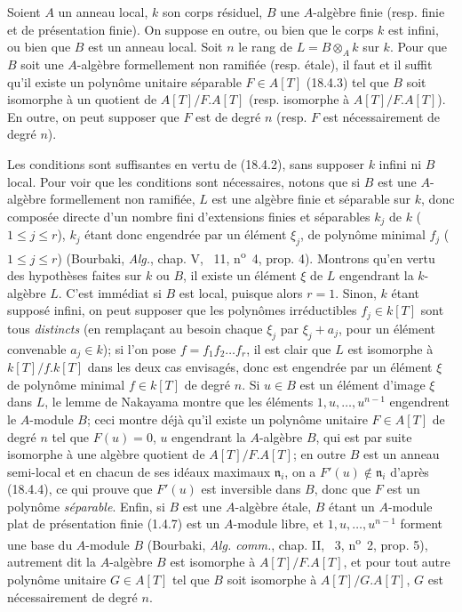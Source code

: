 \begin{proposition}[18.4.5]
\label{IV.18.4.5}
Soient $A$ un anneau local, $k$ son corps résiduel, $B$ une $A$-algèbre finie \textup{(resp.} finie et de présentation finie\textup{)}. On suppose en outre, ou bien que le corps $k$ est infini, ou bien que $B$ est un anneau local. Soit $n$ le rang de $L=B\otimes_A k$ sur $k$. Pour que $B$ soit une $A$-algèbre formellement non ramifiée \textup{(resp.} étale\textup{)}, il faut et il suffit qu'il existe un polynôme unitaire séparable $F\in A[T]$ \textup{(18.4.3)} tel que $B$ soit isomorphe à un quotient de $A[T]/F.A[T]$ \textup{(resp.} isomorphe à $A[T]/F.A[T]$\textup{)}. En outre, on peut supposer que $F$ est de degré $n$ \textup{(resp.} $F$ est nécessairement de degré $n$\textup{)}.
\end{proposition}

Les conditions sont suffisantes en vertu de (18.4.2), sans supposer $k$ infini ni $B$ local. Pour voir que les conditions sont nécessaires, notons que si $B$ est une $A$-algèbre formellement non ramifiée, $L$ est une algèbre finie et séparable sur $k$, donc composée directe d'un nombre fini d'extensions finies et séparables $k_j$ de $k$ ($1\leq j\leq r$), $k_j$ étant donc engendrée par un élément $\xi_j$, de polynôme minimal $f_j$ ($1\leq j\leq r$) (Bourbaki, \emph{Alg.}, chap. V, \textsection~11, n\textsuperscript{o}~4, prop. 4). Montrons qu'en vertu des hypothèses faites sur $k$ ou $B$, il existe un élément $\xi$ de $L$ engendrant la $k$-algèbre $L$. C'est immédiat si $B$ est local, puisque alors $r=1$. Sinon, $k$ étant supposé infini, on peut supposer que les polynômes irréductibles $f_j\in k[T]$ sont tous \emph{distincts} (en remplaçant au besoin chaque $\xi_j$ par $\xi_j+a_j$, pour un élément convenable $a_j\in k$); si l'on pose $f=f_1f_2\ldots f_r$, il est clair que $L$ est isomorphe à $k[T]/f.k[T]$ dans les deux cas envisagés, donc est engendrée par un élément $\xi$ de polynôme minimal $f\in k[T]$ de degré $n$. Si $u\in B$ est un élément d'image $\xi$ dans $L$, le lemme de Nakayama montre que les éléments $1,u,\ldots,u^{n-1}$ engendrent le $A$-module $B$; ceci montre déjà qu'il existe un polynôme unitaire $F\in A[T]$ de degré $n$ tel que $F(u)=0$, $u$ engendrant la $A$-algèbre $B$, qui est par suite isomorphe à une algèbre quotient de $A[T]/F.A[T]$; en outre $B$ est un anneau semi-local et en chacun de ses idéaux maximaux $\mathfrak n_i$, on a $F'(u)\notin\mathfrak n_i$ d'après (18.4.4), ce qui prouve que $F'(u)$ est inversible dans $B$, donc que $F$ est un polynôme \emph{séparable}. Enfin, si $B$ est une $A$-algèbre étale, $B$ étant un $A$-module plat de présentation finie (1.4.7) est un $A$-module libre, et $1,u,\ldots,u^{n-1}$ forment une base du $A$-module $B$ (Bourbaki, \emph{Alg. comm.}, chap. II, \textsection~3, n\textsuperscript{o}~2, prop. 5), autrement dit la $A$-algèbre $B$ est
isomorphe à $A[T]/F.A[T]$, et pour tout autre polynôme unitaire $G\in A[T]$ tel que $B$ soit isomorphe à $A[T]/G.A[T]$, $G$ est nécessairement de degré $n$.

